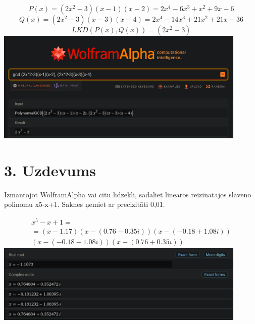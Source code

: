 \documentclass{article}
\begin{document}
\begin{equation*}
    P(x) = (2x^2-3)(x-1)(x-2) = 2x^4-6x^3+x^2+9x-6
\end{equation*}
\begin{equation*}
    Q(x) = (2x^2-3)(x-3)(x-4) = 2x^4-14x^3+21x^2+21x-36
\end{equation*}
\begin{equation*}
    LKD(P(x), Q(x)) = (2x^2-3)
\end{equation*}
\includegraphics[width=0.9\textwidth, center]{2}

\section*{3. Uzdevums}
Izmantojot WolframAlpha vai citu līdzekli, sadaliet lineāros reizinātājos slaveno polinomu x5-x+1. Saknes ņemiet ar precizitāti 0,01.

\begin{gather*}
    x^5-x+1 = \\ = (x-1.17)(x-(0.76 - 0.35i))(x-(-0.18 + 1.08i))\\(x-(-0.18 - 1.08i))(x-(0.76 + 0.35i))
\end{gather*}
\includegraphics[width=0.9\textwidth, center]{3}
\end{document}
